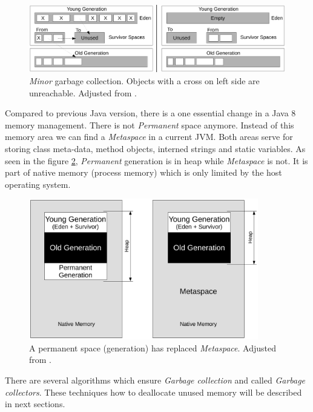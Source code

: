 \documentclass[
  digital, %
  oneside,
  notable, %
  nolof,     %
  nolot     %
]{fithesis3}
\begin{document}
\begin{figure}[h]
	\centering
	\includegraphics[width=13cm]{fig/minor.pdf}
	\caption{\textit{Minor} garbage collection. Objects with a cross on left side are unreachable. Adjusted from \cite{hunt}.}
	\label{minor}
\end{figure}

Compared to previous Java version, there is a one essential change in a Java 8 memory management. There is not \textit{Permanent} space anymore. Instead of this memory area we can find a \textit{Metaspace} in a current JVM. Both areas serve for storing class meta-data, method objects, interned strings and static variables. As seen in the figure \ref{metaspace}, \textit{Permanent} generation is in heap while \textit{Metaspace} is not. It is part of native memory (process memory) which is only limited by the host operating system. \cite{metaspace}

\begin{figure}[h]
	\centering
	\includegraphics[width=10cm]{fig/metaspace.pdf}
	\caption{A permanent space (generation) has replaced \textit{Metaspace}. Adjusted from \cite{metaspace}.}
	\label{metaspace}
\end{figure}



There are several algorithms which ensure \textit{Garbage collection} and called \textit{Garbage collectors}. These techniques how to deallocate unused memory will be described in next sections.
\end{document}
